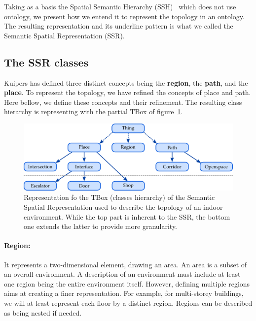 Taking as a basis the Spatial Semantic Hierarchy (SSH)~\cite{kuipers_2000_spatial} which does not use ontology, we present how we entend it to represent the topology in an ontology. The resulting representation and its underline pattern is what we called the Semantic Spatial Representation (SSR).


\subsection{The SSR classes}

Kuipers has defined three distinct concepts being the \textbf{region}, the \textbf{path}, and the \textbf{place}. To represent the topology, we have refined the concepts of place and path. Here bellow, we define these concepts and their refinement. The resulting class hierarchy is representing with the partial TBox of figure~\ref{fig:chap3_tbox}.

\begin{figure}[ht!]
\centering
\includegraphics[scale=0.4]{figures/chapter3/ssr_tbox.png}
\caption{\label{fig:chap3_tbox} Representation fo the TBox (classes hierarchy) of the Semantic Spatial Representation used to describe the topology of an indoor environment. While the top part is inherent to the SSR, the bottom one extends the latter to provide more granularity.}
\end{figure}

\paragraph{Region:} It represents a two-dimensional element, drawing an area. An area is a subset of an overall environment. A description of an environment must include at least one region being the entire environment itself. However, defining multiple regions aims at creating a finer representation. For example, for multi-storey buildings, we will at least represent each floor by a distinct region. Regions can be described as being nested if needed.

